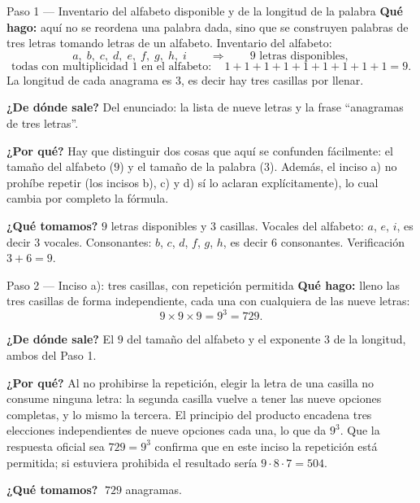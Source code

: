 \documentclass[11pt]{article}
\begin{document}
\begin{paso}{Paso 1 --- Inventario del alfabeto disponible y de la longitud de la palabra}
\textbf{Qué hago:} aquí no se reordena una palabra dada, sino que se construyen palabras de tres letras
tomando letras de un alfabeto. Inventario del alfabeto:
\[
a,\;b,\;c,\;d,\;e,\;f,\;g,\;h,\;i\qquad\Longrightarrow\qquad 9 \text{ letras disponibles},
\]
\[
\text{todas con multiplicidad } 1 \text{ en el alfabeto}:\quad 1+1+1+1+1+1+1+1+1=9 .
\]
La longitud de cada anagrama es $3$, es decir hay tres casillas por llenar.

\textbf{¿De dónde sale?} Del enunciado: la lista de nueve letras y la frase ``anagramas de tres letras''.

\textbf{¿Por qué?} Hay que distinguir dos cosas que aquí se confunden fácilmente: el tamaño del alfabeto
($9$) y el tamaño de la palabra ($3$). Además, el inciso a) no prohíbe repetir (los incisos b), c) y d) sí
lo aclaran explícitamente), lo cual cambia por completo la fórmula.

\textbf{¿Qué tomamos?} $9$ letras disponibles y $3$ casillas. Vocales del alfabeto: $a$, $e$, $i$, es
decir $3$ vocales. Consonantes: $b$, $c$, $d$, $f$, $g$, $h$, es decir $6$ consonantes. Verificación
$3+6=9$.
\end{paso}

\begin{paso}{Paso 2 --- Inciso a): tres casillas, con repetición permitida}
\textbf{Qué hago:} lleno las tres casillas de forma independiente, cada una con cualquiera de las nueve
letras:
\[
9\times9\times9=9^{3}=729 .
\]

\textbf{¿De dónde sale?} El $9$ del tamaño del alfabeto y el exponente $3$ de la longitud, ambos del
Paso 1.

\textbf{¿Por qué?} Al no prohibirse la repetición, elegir la letra de una casilla no consume ninguna
letra: la segunda casilla vuelve a tener las nueve opciones completas, y lo mismo la tercera. El principio
del producto encadena tres elecciones independientes de nueve opciones cada una, lo que da $9^3$. Que la
respuesta oficial sea $729=9^3$ confirma que en este inciso la repetición está permitida; si estuviera
prohibida el resultado sería $9\cdot8\cdot7=504$.

\textbf{¿Qué tomamos?} $\;729$ anagramas.
\end{paso}
\end{document}
